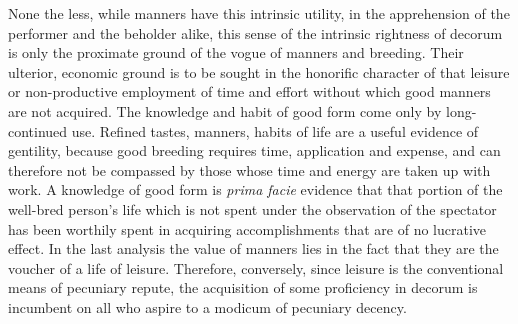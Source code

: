\documentclass[12pt]{report}
\begin{document}
None the less, while manners have this intrinsic utility, in the
apprehension of the performer and the beholder alike, this sense of the
intrinsic rightness of decorum is only the proximate ground of the vogue
of manners and breeding. Their ulterior, economic ground is to be sought
in the honorific character of that leisure or non-productive employment
of time and effort without which good manners are not acquired. The
knowledge and habit of good form come only by long-continued use.
Refined tastes, manners, habits of life are a useful evidence of
gentility, because good breeding requires time, application and expense,
and can therefore not be compassed by those whose time and energy are
taken up with work. A knowledge of good form is \emph{prima facie} evidence
that that portion of the well-bred person's life which is not spent
under the observation of the spectator has been worthily spent in
acquiring accomplishments that are of no lucrative effect. In the last
analysis the value of manners lies in the fact that they are the voucher
of a life of leisure. Therefore, conversely, since leisure is the
conventional means of pecuniary repute, the acquisition of some
proficiency in decorum is incumbent on all who aspire to a modicum of
pecuniary decency.
\end{document}

